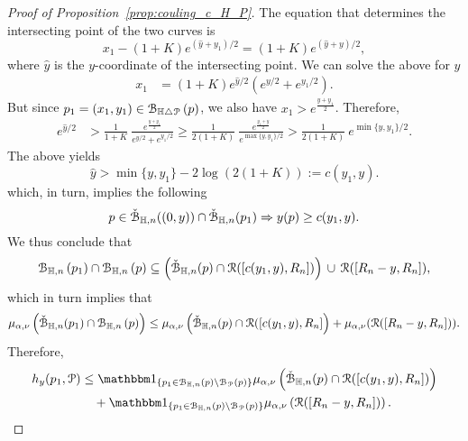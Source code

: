 \begin{proof}[Proof of Proposition~\ref{prop:couling_c_H_P}]
The equation that determines the intersecting point of the two curves is
\[
	x_1 - (1+K)e^{(\hat{y} + y_1)/2}= (1+K) e^{(\hat{y} + y)/2},
\]
where $\hat{y}$ is the $y$-coordinate of the intersecting point. 
We can solve the above for $\hat{y}$  
\begin{equation*} 
\begin{split}
x_1 &=(1+K) e^{\hat{y}/2} \left( e^{y/2} + e^{y_1/2} \right).
\end{split}
\end{equation*}
But since $p_1=(x_1,y_1)  \in {\mathcal B}_{\mathbb{H} \bigtriangleup {\mathcal P}}\left(p\right)$, we also have $x_1 > e^{\frac{y + y_1}{2}}$. Therefore, 
\begin{equation*}
\begin{split}
 e^{\hat{y}/2}& > \frac{1}{1+K}~\frac{e^{\frac{y + y_1}{2}}}{ e^{y/2}+ e^{y_1/2}} \geq 
\frac{1}{2(1+K)}~\frac{e^{\frac{y_1 + y}{2}}}{ e^{\max \{y, y_1\} /2}} 
> \frac{1}{2(1 + K)} ~ e^{\min\{y, y_1\}/2}. 
 \end{split}
\end{equation*}
The above yields
\begin{equation} \label{eq:to_use_I}
\hat{y} > \min\{y, y_1\} - 2\log(2(1+K)) := c(y_1, y). 
\end{equation}
which, in turn, implies the following 
\begin{equation}\label{eq:intersex_approx}
	p \in \check{{\mathcal B}}_{\mathbb{H},n}((0,y))\cap \check{{\mathcal B}}_{\mathbb{H},n}(p_1) \Rightarrow y(p) \ge c(y_1,y).
\end{equation}
We thus conclude that 
\[ 
	{\mathcal B}_{\mathbb{H},n}\left(p_1\right) \cap {\mathcal B}_{\mathbb{H},n}\left(p\right) \subseteq \left(\check{{\mathcal B}}_{\mathbb{H},n}(p) \cap {\mathcal R}([c(y_1,y), R_n])\right)
	\, \cup \, {\mathcal R} ([R_n - y,R_n]),
\]
which in turn implies that
\[
	\mu_{\alpha,\nu} \left( \check{{\mathcal B}}_{\mathbb{H},n}(p_1) \cap {\mathcal B}_{\mathbb{H},n}\left(p\right) \right) \leq 
	\mu_{\alpha,\nu}\left( \check{{\mathcal B}}_{\mathbb{H},n}(p) \cap  {\mathcal R}([c(y_1,y), R_n]\right) + 
	\mu_{\alpha,\nu} ({\mathcal R} ([R_n - y, R_n]) ).
\]
Therefore, 
\begin{align*} 
	h_y(p_1, \Pcal) &\leq \ind{p_1 \in \BallHyp{p}\setminus \BallPo{p}} 
    	\mu_{\alpha,\nu}  \left( \FatBallHyp{p} \cap  \Rcal([c(y_1,y), R_n])\right)
        \\
	&\hspace{10pt}+ \ind{p_1 \in \BallHyp{p}\setminus \BallPo{p}}
    	\mu_{\alpha,\nu}  \left( \Rcal ([R_n - y, R_n]) \right).
\end{align*}




\end{proof}
